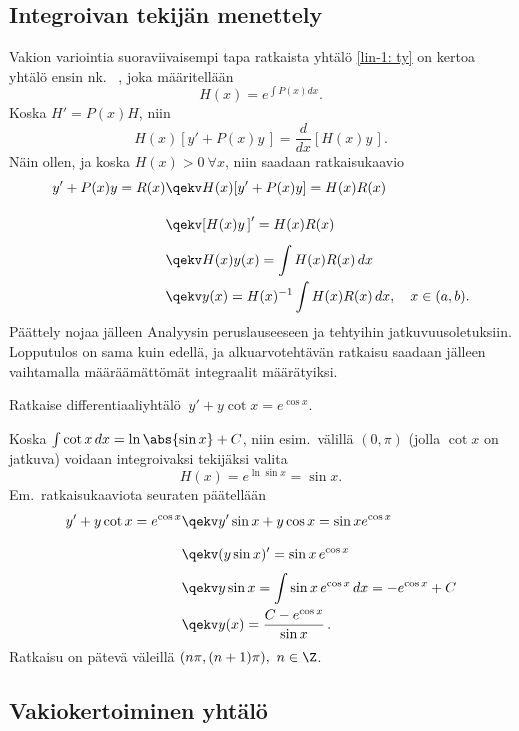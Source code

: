 \subsection{Integroivan tekijän menettely}

Vakion variointia suoraviivaisempi tapa ratkaista yhtälö \eqref{lin-1: ty} on kertoa yhtälö
ensin nk.\ 
, joka määritellään
\[
H(x)= e^{\int P(x)dx}.
\]
Koska $H'=P(x)H$, niin
\[
H(x)[y'+P(x)y\,] = \frac{d}{dx}[H(x)y\,].
\]
Näin ollen, ja koska $H(x)>0\ \forall x$, niin saadaan ratkaisukaavio
\begin{align*}
y'+P(x)y = R(x) &\qekv H(x)[y'+P(x)y] = H(x)R(x) \\[3.5mm]
                &\qekv [H(x)y\,]' = H(x)R(x) \\[1.5mm]
                &\qekv H(x)y(x) = \int H(x)R(x)\,dx \\
                &\qekv y(x) = H(x)^{-1}\int H(x)R(x)\,dx, \quad x\in(a,b).
\end{align*}
Päättely nojaa jälleen Analyysin peruslauseeseen ja tehtyihin jatkuvuusoletuksiin. Lopputulos
on sama kuin edellä, ja alkuarvotehtävän ratkaisu saadaan jälleen vaihtamalla määräämättömät
integraalit määrätyiksi.
\begin{Exa}
Ratkaise differentiaaliyhtälö $\ y'+y\cot x=e^{\cos x}$.
\end{Exa}
\ratk Koska $\int \cot x\,dx=\ln\abs{\sin x}+C$, niin esim.\ välillä $(0,\pi)$ 
(jolla $\cot x$ on jatkuva) voidaan integroivaksi tekijäksi valita
\[
H(x)=e^{\ln\sin x}=\sin x.
\]
Em.\ ratkaisukaaviota seuraten päätellään
\begin{align*}
y'+y\cot x=e^{\cos x} &\qekv y'\sin x+y\cos x = \sin x e^{\cos x} \\[3mm]
                      &\qekv (y\sin x)'=\sin x\,e^{\cos x} \\[1mm]
                      &\qekv y\sin x = \int \sin x\,e^{\cos x}\,dx = -e^{\cos x}+C \\
                      &\qekv y(x)=\frac{C-e^{\cos x}}{\sin x}\,.
\end{align*}
Ratkaisu on pätevä väleillä $(n\pi,(n+1)\pi),\ n\in\Z$. \loppu

\subsection{Vakiokertoiminen yhtälö}
\index{vakiokertoiminen DY|vahv}

